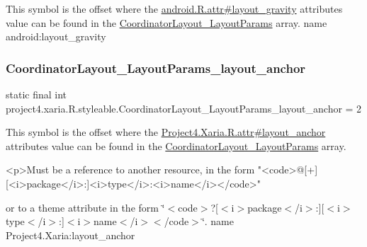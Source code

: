 This symbol is the offset where the \hyperlink{}{android.\+R.\+attr\#layout\+\_\+gravity} attribute\textquotesingle{}s value can be found in the \hyperlink{classproject4_1_1xaria_1_1R_1_1styleable_ad7c97c688ef4dae4ebe89418a84dab5d}{Coordinator\+Layout\+\_\+\+Layout\+Params} array.  name android\+:layout\+\_\+gravity \mbox{\label{classproject4_1_1xaria_1_1R_1_1styleable_acd12b16f8a05e1b4ae6a327d285ff2e0}} 
\subsubsection{\texorpdfstring{Coordinator\+Layout\+\_\+\+Layout\+Params\+\_\+layout\+\_\+anchor}{CoordinatorLayout\_LayoutParams\_layout\_anchor}}
{\footnotesize\ttfamily static final int project4.\+xaria.\+R.\+styleable.\+Coordinator\+Layout\+\_\+\+Layout\+Params\+\_\+layout\+\_\+anchor = 2\hspace{0.3cm}{\ttfamily [static]}}

This symbol is the offset where the \hyperlink{}{Project4.\+Xaria.\+R.\+attr\#layout\+\_\+anchor} attribute\textquotesingle{}s value can be found in the \hyperlink{classproject4_1_1xaria_1_1R_1_1styleable_ad7c97c688ef4dae4ebe89418a84dab5d}{Coordinator\+Layout\+\_\+\+Layout\+Params} array.

\begin{DoxyVerb}      <p>Must be a reference to another resource, in the form "<code>@[+][<i>package</i>:]<i>type</i>:<i>name</i></code>"
\end{DoxyVerb}
 or to a theme attribute in the form \char`\"{}$<$code$>$?\mbox{[}$<$i$>$package$<$/i$>$\+:\mbox{]}\mbox{[}$<$i$>$type$<$/i$>$\+:\mbox{]}$<$i$>$name$<$/i$>$$<$/code$>$\char`\"{}.  name Project4.\+Xaria\+:layout\+\_\+anchor \mbox{\label{classproject4_1_1xaria_1_1R_1_1styleable_a925c4c2bfdf0e1acd8bbc979d2aec36a}} 
